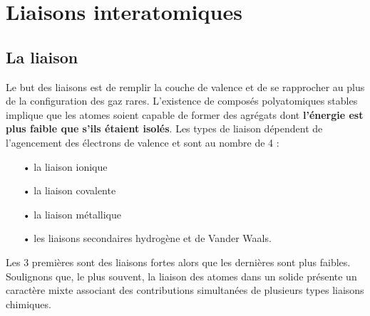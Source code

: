 
\chapter{Liaisons interatomiques}
\section{La liaison}
Le but des liaisons est de remplir la couche de valence et de se rapprocher au plus de la configuration des gaz rares. L'existence de composés polyatomiques stables implique que les atomes soient capable de former des agrégats dont \textbf{l'énergie est plus faible que s'ils étaient isolés}. Les types de liaison dépendent de l'agencement des électrons de valence et sont au nombre de 4 : \\

\begin{itemize}
	\item[•] la liaison ionique
	\item[•] la liaison covalente
	\item[•] la liaison métallique
	\item[•] les liaisons secondaires hydrogène et de Vander Waals. \\
\end{itemize}
	
Les 3 premières sont des liaisons fortes alors que les dernières sont plus faibles. Soulignons que, le plus souvent, la liaison des atomes dans un solide présente un caractère mixte associant des contributions simultanées de plusieurs types liaisons chimiques.
	
